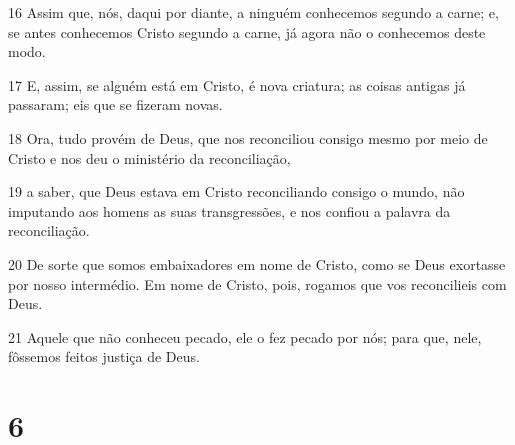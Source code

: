 \par 16 Assim que, nós, daqui por diante, a ninguém conhecemos segundo a carne; e, se antes conhecemos Cristo segundo a carne, já agora não o conhecemos deste modo.
\par 17 E, assim, se alguém está em Cristo, é nova criatura; as coisas antigas já passaram; eis que se fizeram novas.
\par 18 Ora, tudo provém de Deus, que nos reconciliou consigo mesmo por meio de Cristo e nos deu o ministério da reconciliação,
\par 19 a saber, que Deus estava em Cristo reconciliando consigo o mundo, não imputando aos homens as suas transgressões, e nos confiou a palavra da reconciliação.
\par 20 De sorte que somos embaixadores em nome de Cristo, como se Deus exortasse por nosso intermédio. Em nome de Cristo, pois, rogamos que vos reconcilieis com Deus.
\par 21 Aquele que não conheceu pecado, ele o fez pecado por nós; para que, nele, fôssemos feitos justiça de Deus.

\chapter{6}

